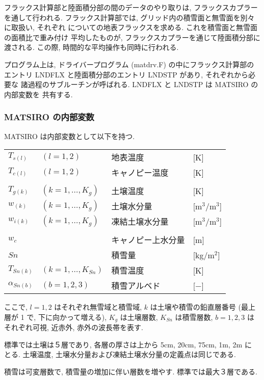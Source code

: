 フラックス計算部と陸面積分部の間のデータのやり取りは, フラックスカプラー
を通して行われる.
フラックス計算部では, グリッド内の積雪面と無雪面を別々に取扱い, それぞれ
についての地表フラックスを求める. これを積雪面と無雪面の面積比で重み付け
平均したものが, フラックスカプラーを通じて陸面積分部に渡される.
この際, 時間的な平均操作も同時に行われる.

プログラム上は, ドライバープログラム (matdrv.F) の中にフラックス計算部の
エントリ LNDFLX と陸面積分部のエントリ LNDSTP があり, それぞれから必要な
諸過程のサブルーチンが呼ばれる. LNDFLX と LNDSTP は MATSIRO の内部変数を
共有する.

\subsubsection{MATSIRO の内部変数}

MATSIRO は内部変数として以下を持つ.

\begin{tabular}{llll}
$T_{s(l)}$      & $(l=1,2)$           & 地表温度 & [K]\\
$T_{c(l)}$      & $(l=1,2)$           & キャノピー温度 & [K]\\
\\
$T_{g(k)}$      & $(k=1,\ldots,K_g)$  & 土壌温度 & [K]\\
$w_{(k)} $      & $(k=1,\ldots,K_g)$  & 土壌水分量 & [m$^3$/m$^3$]\\
$w_{i(k)}$      & $(k=1,\ldots,K_g)$  & 凍結土壌水分量 & [m$^3$/m$^3$]\\
\\
$w_c$         &                     & キャノピー上水分量 & [m]\\
$Sn$          &                     & 積雪量 & [kg/m$^2$]\\
$T_{Sn(k)}$      & $(k=1,\ldots,K_{Sn})$  & 積雪温度 & [K]\\
$\alpha_{Sn(b)}$ & $(b=1,2,3)$         & 積雪アルベド & [$-$]
\end{tabular}
\medskip

ここで, $l=1,2$ はそれぞれ無雪域と積雪域, $k$ は土壌や積雪の鉛直層番号
(最上層が 1 で, 下に向かって増える), $K_g$ は土壌層数, $K_{Sn}$ は積雪層数,
$b=1,2,3$ はそれぞれ可視, 近赤外, 赤外の波長帯を表す.

標準では土壌は５層であり, 各層の厚さは上から 5cm, 20cm, 75cm, 1m, 2m に
とる. 土壌温度, 土壌水分量および凍結土壌水分量の定義点は同じである.

積雪は可変層数で, 積雪量の増加に伴い層数を増やす. 標準では最大３層である.

